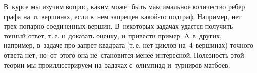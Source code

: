 



В~курсе мы изучим вопрос, каким может быть максимальное количество ребер графа
на~$n$~вершинах, если в~нем запрещен какой-то подграф.
Например, нет трех попарно соединенных вершин.
В~некоторых задачах удается получить точный ответ, т.\,е. и~доказать оценку,
и~привести пример.
А~в~других, например, в~задаче про запрет квадрата (т.\,е. нет циклов
на~4~вершинах) точного ответа нет, но~от~этого она не~становится менее
интересной.
Полезность этой теории мы проиллюстрируем на~задачах с~олимпиад и~турниров
матбоев.


